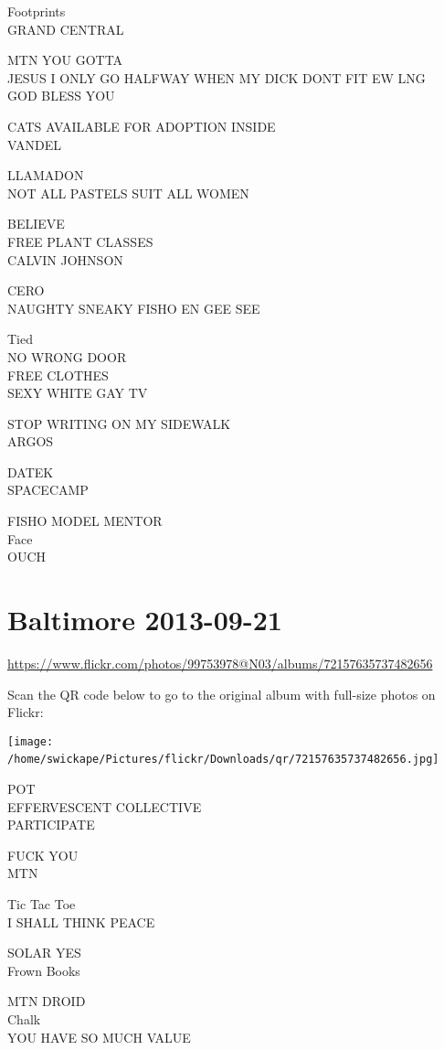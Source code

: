 \documentclass[10pt,letterpaper]{article}
\begin{document}
Footprints\\
GRAND CENTRAL

MTN YOU GOTTA\\
JESUS I ONLY GO HALFWAY WHEN MY DICK DONT FIT EW LNG\\
GOD BLESS YOU

CATS AVAILABLE FOR ADOPTION INSIDE\\
VANDEL

LLAMADON\\
NOT ALL PASTELS SUIT ALL WOMEN

BELIEVE\\
FREE PLANT CLASSES\\
CALVIN JOHNSON

CERO\\
NAUGHTY SNEAKY FISHO EN GEE SEE

Tied\\
NO WRONG DOOR\\
FREE CLOTHES\\
SEXY WHITE GAY TV

STOP WRITING ON MY SIDEWALK\\
ARGOS

DATEK\\
SPACECAMP

FISHO MODEL MENTOR\\
Face\\
OUCH
\

\section*{Baltimore 2013-09-21}

\url{https://www.flickr.com/photos/99753978@N03/albums/72157635737482656}

Scan the QR code below to go to the original album with full-size photos on Flickr:

\texttt{[image: /home/swickape/Pictures/flickr/Downloads/qr/72157635737482656.jpg]}
\

POT\\
EFFERVESCENT COLLECTIVE\\
PARTICIPATE

FUCK YOU\\
MTN

Tic Tac Toe\\
I SHALL THINK PEACE

SOLAR YES\\
Frown Books

MTN DROID\\
Chalk\\
YOU HAVE SO MUCH VALUE
\end{document}
